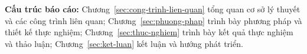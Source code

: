 \textbf{Cấu trúc báo cáo:} Chương~\ref{sec:cong-trinh-lien-quan} tổng quan cơ sở lý thuyết và các công trình liên quan; Chương~\ref{sec:phuong-phap} trình bày phương pháp và thiết kế thực nghiệm; Chương~\ref{sec:thuc-nghiem} trình bày kết quả thực nghiệm và thảo luận; Chương~\ref{sec:ket-luan} kết luận và hướng phát triển.
